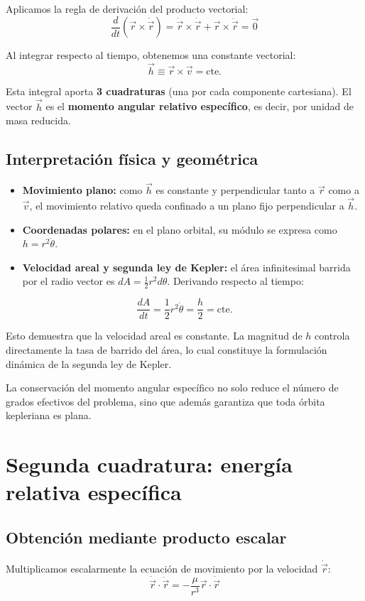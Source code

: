 Aplicamos la regla de derivación del producto vectorial:
\[
\frac{d}{dt}(\vec{r} \times \dot{\vec{r}}) = \dot{\vec{r}} \times \dot{\vec{r}} + \vec{r} \times \ddot{\vec{r}} = \vec{0}
\]

Al integrar respecto al tiempo, obtenemos una constante vectorial:
\[
\vec{h} \equiv \vec{r} \times \vec{v} = \text{cte.}
\]

Esta integral aporta \textbf{3 cuadraturas} (una por cada componente cartesiana). El vector \(\vec{h}\) es el \textbf{momento angular relativo específico}, es decir, por unidad de masa reducida.

\subsection{Interpretación física y geométrica}
\begin{itemize}
    \item \textbf{Movimiento plano:} como \(\vec{h}\) es constante y perpendicular tanto a \(\vec{r}\) como a \(\vec{v}\), el movimiento relativo queda confinado a un plano fijo perpendicular a \(\vec{h}\).
    \item \textbf{Coordenadas polares:} en el plano orbital, su módulo se expresa como \(h = r^2\dot{\theta}\).
    \item \textbf{Velocidad areal y segunda ley de Kepler:} el área infinitesimal barrida por el radio vector es \(dA = \frac{1}{2}r^2 d\theta\). Derivando respecto al tiempo:
\end{itemize}

\[
\frac{dA}{dt} = \frac{1}{2}r^2\dot{\theta} = \frac{h}{2} = \text{cte.}
\]

Esto demuestra que la velocidad areal es constante. La magnitud de \(h\) controla directamente la tasa de barrido del área, lo cual constituye la formulación dinámica de la segunda ley de Kepler.

\begin{importante}
La conservación del momento angular específico no solo reduce el número de grados efectivos del problema, sino que además garantiza que toda órbita kepleriana es plana.
\end{importante}

\section{Segunda cuadratura: energía relativa específica}
\subsection{Obtención mediante producto escalar}
Multiplicamos escalarmente la ecuación de movimiento por la velocidad \(\dot{\vec{r}}\):
\[
\dot{\vec{r}} \cdot \ddot{\vec{r}} = -\frac{\mu}{r^3}\vec{r} \cdot \dot{\vec{r}}
\]

